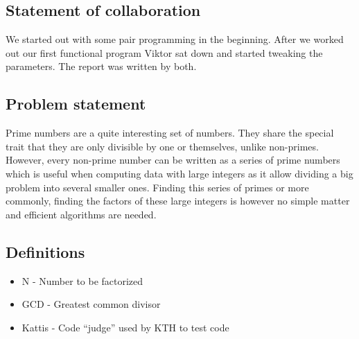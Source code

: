 \subsection{Statement of collaboration}
We started out with some pair programming in the beginning. After we worked out our first functional program Viktor sat down and started tweaking the parameters. The report was written by both.  

\subsection{Problem statement}
Prime numbers are a quite interesting set of numbers. They share the special trait that they are only divisible by one or themselves, unlike non-primes. However, every non-prime number can be written as a series of prime numbers which is useful when computing data with large integers as it allow dividing a big problem into several smaller ones.
Finding this series of primes or more commonly, finding the factors of these large integers is however no simple matter and efficient algorithms are needed.

\subsection{Definitions}
	
\begin{itemize}
  \item N - Number to be factorized
  \item GCD - Greatest common divisor
  \item Kattis - Code “judge” used by KTH to test code
\end{itemize}
